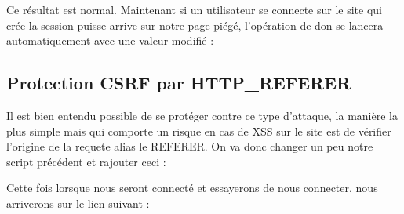 \documentclass{article}
\begin{document}
Ce résultat est normal. Maintenant si un utilisateur se connecte sur le site qui crée la session puisse arrive sur notre page piégé, l'opération de don se lancera automatiquement avec une valeur modifié :
\vspace{0.2cm}\\
\vspace{0.2cm}

\subsection{Protection CSRF par HTTP\_REFERER}

Il est bien entendu possible de se protéger contre ce type d'attaque, la manière la plus simple mais qui comporte un risque en cas de XSS sur le site est de vérifier l'origine de la requete alias le REFERER. On va donc changer un peu notre script précédent et rajouter ceci :
\vspace{0.2cm}\\
\vspace{0.2cm}

Cette fois lorsque nous seront connecté et essayerons de nous connecter, nous arriverons sur le lien suivant :
\vspace{0.2cm}\\
\vspace{0.2cm}
\end{document}
